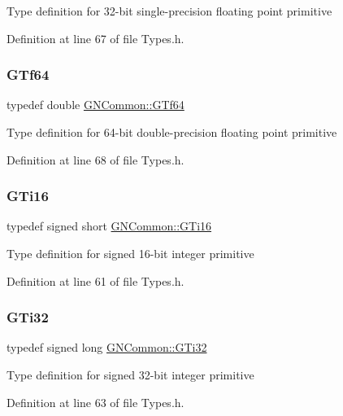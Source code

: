 Type definition for 32-\/bit single-\/precision floating point primitive 

Definition at line 67 of file Types.\+h.

\mbox{\label{namespace_g_n_common_a22b37ff753b3e7a48d9d31addf35a739}} 
\subsubsection{\texorpdfstring{G\+Tf64}{GTf64}}
{\footnotesize\ttfamily typedef double \mbox{\hyperlink{namespace_g_n_common_a22b37ff753b3e7a48d9d31addf35a739}{G\+N\+Common\+::\+G\+Tf64}}}

Type definition for 64-\/bit double-\/precision floating point primitive 

Definition at line 68 of file Types.\+h.

\mbox{\label{namespace_g_n_common_a965aa02d673a0945678428639d7a3376}} 
\subsubsection{\texorpdfstring{G\+Ti16}{GTi16}}
{\footnotesize\ttfamily typedef signed short \mbox{\hyperlink{namespace_g_n_common_a965aa02d673a0945678428639d7a3376}{G\+N\+Common\+::\+G\+Ti16}}}

Type definition for signed 16-\/bit integer primitive 

Definition at line 61 of file Types.\+h.

\mbox{\label{namespace_g_n_common_a260b179001602cd6e8226d384ec8581c}} 
\subsubsection{\texorpdfstring{G\+Ti32}{GTi32}}
{\footnotesize\ttfamily typedef signed long \mbox{\hyperlink{namespace_g_n_common_a260b179001602cd6e8226d384ec8581c}{G\+N\+Common\+::\+G\+Ti32}}}

Type definition for signed 32-\/bit integer primitive 

Definition at line 63 of file Types.\+h.

